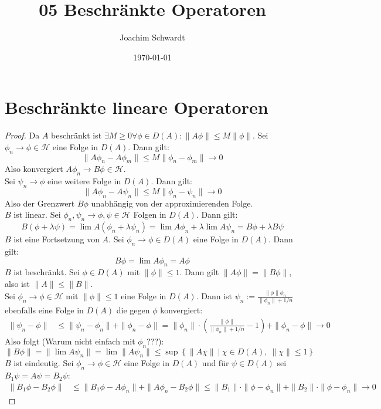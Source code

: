 \documentclass[a4paper,12pt]{article}
\newcommand{\kla}{}
\newcommand{\klammer}{}
\begin{document}
\title{05 Beschränkte Operatoren}
\author{Joachim Schwardt}
\date{\today}
\maketitle

\section{Beschränkte lineare Operatoren}
\begin{proof}
Da $A$ beschränkt ist $\exists M\ge 0\forall\phi\in D(A):\|A\phi\|\le M\|\phi\|$. Sei $\phi_n\rightarrow\phi\in\mathcal{H}$ eine Folge in $D(A)$. Dann gilt:
$$\|A\phi_n-A\phi_m\|\le M\|\phi_n-\phi_m\|\rightarrow 0$$
Also konvergiert $A\phi_n\rightarrow B\phi\in\mathcal{H}$.\\
Sei $\psi_n\rightarrow\phi $ eine weitere Folge in $D(A)$. Dann gilt:
$$\|A\phi_n-A\psi_n\|\le M\|\phi_n-\psi_n\|\rightarrow 0$$
Also der Grenzwert $B\phi$ unabhängig von der approximierenden Folge.\\
$B$ ist linear. Sei $\phi_n,\psi_n\rightarrow\phi,\psi\in\mathcal{H}$ Folgen in $D(A)$. Dann gilt:
$$B(\phi+\lambda\psi)=\lim A(\phi_n+\lambda\psi_n)=\lim A\phi_n+\lambda \lim A\psi_n=B\phi+\lambda B\psi$$
$B$ ist eine Fortsetzung von $A$. Sei $\phi_n\rightarrow\phi\in D(A)$ eine Folge in $D(A)$. Dann gilt:
$$B\phi =\lim A\phi_n=A\phi $$
$B$ ist beschränkt. Sei $\phi\in D(A)$ mit $\|\phi\|\le 1$. Dann gilt $\|A\phi\|=\|B\phi\|$, also ist $\|A\|\le\|B\|$. \\
Sei $\phi_n\rightarrow\phi\in\mathcal{H}$ mit $\|\phi\|\le 1$ eine Folge in $D(A)$. Dann ist $\psi_n:=\frac{\|\phi\|\phi_n}{\|\phi_n\|+1/n}$ ebenfalls eine Folge in $D(A)$ die gegen $\phi$ konvergiert:
\begin{align*}
\|\psi_n-\phi\|&\le \|\psi_n-\phi_n\|+\|\phi_n-\phi\|=\|\phi_n\|\cdot\kla\left( {\frac{\|\phi\|}{\|\phi_n\|+1/n}-1} \right)+\|\phi_n-\phi\|\rightarrow 0
\end{align*}
Also folgt (Warum nicht einfach mit $\phi_n$???):
$$\|B\phi\|=\|\lim A\psi_n\|=\lim\|A\psi_n\|\le\sup \klammer\left\{ {\|A\chi\|\ |\ \chi\in D(A),\ \|\chi\|\le 1} \right\}$$
$B$ ist eindeutig. Sei $\phi_n\rightarrow\phi\in\mathcal{H}$ eine Folge in $D(A)$ und für $\psi\in D(A)$ sei $B_1\psi=A\psi=B_2\psi$:
\begin{align*}
\|B_1\phi-B_2\phi\|&\le\|B_1\phi-A\phi_n\|+\|A\phi_n-B_2\phi\|\le\|B_1\|\cdot\|\phi-\phi_n\|+\|B_2\|\cdot\|\phi-\phi_n\|\rightarrow 0
\end{align*}
\end{proof}
\end{document}

